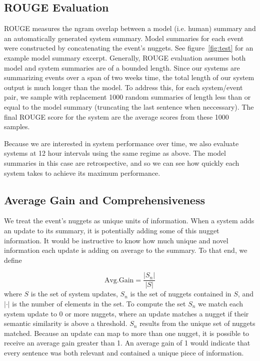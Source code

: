 \subsection{ROUGE Evaluation}

ROUGE measures the ngram overlap between a model (i.e. human) summary 
and an automatically generated system summary. 
Model summaries for each event were constructed by concatenating the event's 
nuggets. 
See figure~\ref{fig:test} for an example model summary excerpt.
Generally, ROUGE evaluation assumes both model and system summaries
are of a bounded length. Since our systems are summarizing events over a span
of two weeks time, the total length of our system output is much longer than
the model. To address this, for each system/event pair, we sample with replacement
1000 random summaries of length less than or equal to the model summary 
(truncating the last sentence when neccessary). The final ROUGE score for the 
system are the average scores from these 1000 samples.

Because we are interested in system performance over time, we also evaluate 
systems at 12 hour intervals using the same regime as above. 
The model summaries in this case are retrospective, and so we can see how quickly
each system takes to achieve its maximum performance.

\subsection{Average Gain and Comprehensiveness}

 
We treat the event's nuggets as unique units of information.
When a system adds an update to its summary, it is potentially adding some
of this nugget information. It would be instructive to know how much unique
and novel information each update is adding on average to the summary.
To that end, we define

\[ \mathrm{Avg. Gain} = \frac{|S_n|}{|S|}%
\] 
where $S$ is the set of system updates, 
$S_n$ is the set of nuggets contained in $S$, and $|\cdot|$ is the number of
elements in the set.
To compute the set $S_n$ we match each system update to 0 or more nuggets, 
where an update matches a nugget if their semantic similarity is above 
a threshold. $S_n$ results from the unique set of nuggets matched.
Because an update can map to more than one nugget, it is possible to receive an
average gain greater than 1. An average gain of 1 would indicate that every
sentence was both relevant and contained a unique piece of information.



